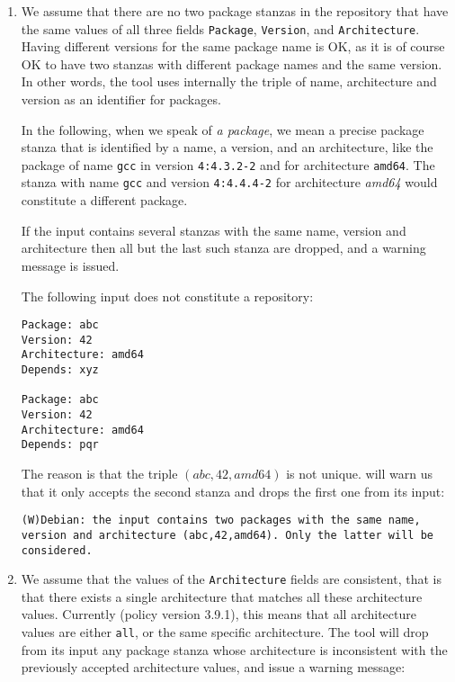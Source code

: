 \begin{enumerate}
\item
  We assume that there are no two package stanzas in the repository
  that have the same values of all three fields \texttt{Package},
  \texttt{Version}, and \texttt{Architecture}. Having different
  versions for the same package name is OK, as it is of course OK to
  have two stanzas with different package names and the same version.
  In other words, the \debcheck{} tool uses internally the triple of
  name, architecture and version as an identifier for packages.

  In the following, when we speak of \emph{a package}, we mean a
  precise package stanza that is identified by a name, a version, and
  an architecture, like the package of name \texttt{gcc} in version
  \texttt{4:4.3.2-2} and for architecture \texttt{amd64}. The stanza with name
  \texttt{gcc} and version \texttt{4:4.4.4-2} for architecture
  \textit{amd64} would constitute a different package.

  If the input contains several stanzas with the same name, version
  and architecture then all but the last such stanza are dropped, and a 
  warning message is issued.

\begin{example} The following input does not constitute a repository:
\begin{verbatim}
Package: abc
Version: 42
Architecture: amd64
Depends: xyz

Package: abc
Version: 42
Architecture: amd64
Depends: pqr
\end{verbatim}
The reason is that the triple $(abc,42,amd64)$ is not
unique. \debcheck{} will warn us that it only accepts the second
stanza and drops the first one from its input:
\begin{verbatim}
(W)Debian: the input contains two packages with the same name, version and architecture (abc,42,amd64). Only the latter will be considered.
\end{verbatim}
\end{example}

\item
  We assume that the values of the \texttt{Architecture} fields are
  consistent, that is that there exists a single architecture that
  matches all these architecture values. Currently (policy version
  3.9.1), this means that all architecture values are either
  \texttt{all}, or the same specific architecture. The \debcheck{} tool
  will drop from its input any package stanza whose architecture is
  inconsistent with the previously accepted architecture values, and
  issue a warning message:


\end{enumerate}
